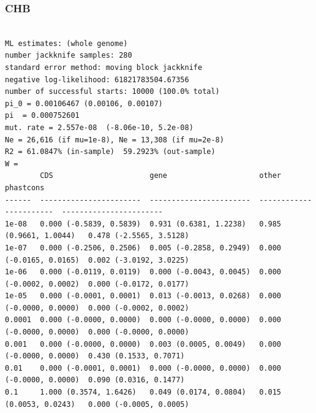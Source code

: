 \documentclass[11pt]{article}
\begin{document}
\subsubsection*{CHB}
\begin{minipage}{\linewidth}\begin{footnotesize}
\begin{verbatim}

ML estimates: (whole genome)
number jackknife samples: 280
standard error method: moving block jackknife
negative log-likelihood: 61821783504.67356
number of successful starts: 10000 (100.0% total)
pi_0 = 0.00106467 (0.00106, 0.00107)
pi  = 0.000752601
mut. rate = 2.557e-08  (-8.06e-10, 5.2e-08)
Ne = 26,616 (if mu=1e-8), Ne = 13,308 (if mu=2e-8)
R2 = 61.0847% (in-sample)  59.2923% (out-sample)
W = 
        CDS                      gene                     other                    phastcons
------  -----------------------  -----------------------  -----------------------  -----------------------
1e-08   0.000 (-0.5839, 0.5839)  0.931 (0.6381, 1.2238)   0.985 (0.9661, 1.0044)   0.478 (-2.5565, 3.5128)
1e-07   0.000 (-0.2506, 0.2506)  0.005 (-0.2858, 0.2949)  0.000 (-0.0165, 0.0165)  0.002 (-3.0192, 3.0225)
1e-06   0.000 (-0.0119, 0.0119)  0.000 (-0.0043, 0.0045)  0.000 (-0.0002, 0.0002)  0.000 (-0.0172, 0.0177)
1e-05   0.000 (-0.0001, 0.0001)  0.013 (-0.0013, 0.0268)  0.000 (-0.0000, 0.0000)  0.000 (-0.0002, 0.0002)
0.0001  0.000 (-0.0000, 0.0000)  0.000 (-0.0000, 0.0000)  0.000 (-0.0000, 0.0000)  0.000 (-0.0000, 0.0000)
0.001   0.000 (-0.0000, 0.0000)  0.003 (0.0005, 0.0049)   0.000 (-0.0000, 0.0000)  0.430 (0.1533, 0.7071)
0.01    0.000 (-0.0001, 0.0001)  0.000 (-0.0000, 0.0000)  0.000 (-0.0000, 0.0000)  0.090 (0.0316, 0.1477)
0.1     1.000 (0.3574, 1.6426)   0.049 (0.0174, 0.0804)   0.015 (0.0053, 0.0243)   0.000 (-0.0005, 0.0005)
\end{verbatim}
\end{footnotesize}\end{minipage}
\end{document}
